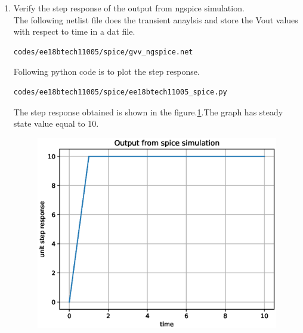 \begin{enumerate}[label=\arabic*.,ref=\theenumi]
\item Verify the step response of the output from ngspice simulation.\\
\solution The following netlist file does the transient anaylsis and store the Vout values with respect to time in a dat file. 
\begin{lstlisting}
codes/ee18btech11005/spice/gvv_ngspice.net
\end{lstlisting}
Following python code is to plot the step response.
\begin{lstlisting}
codes/ee18btech11005/spice/ee18btech11005_spice.py
\end{lstlisting}
The step response obtained is shown in the figure.\ref{fig:ee18btech11005_3}.The graph has steady state value equal to 10.
\begin{figure}[!ht]
\centering
\includegraphics[width=\columnwidth]{./figs/ee18btech11005/ee18btech11005_spice.eps}
\caption{}
\label{fig:ee18btech11005_3}
\end{figure}
\end{enumerate}


